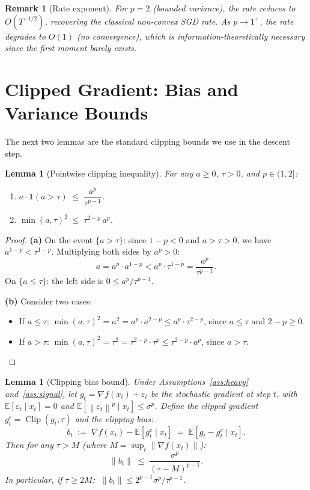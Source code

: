 \documentclass[11pt]{article}
\newtheorem{lemma}[theorem]{Lemma}
\newtheorem{remark}[theorem]{Remark}
\theoremstyle{definition}
\newcommand{\E}{\mathbb{E}}
\newcommand{\norm}[1]{\left\| #1 \right\|}
\newcommand{\clip}{\operatorname{Clip}}
\begin{document}
\begin{remark}[Rate exponent]
For $p = 2$ (bounded variance), the rate reduces to $O(T^{-1/2})$, recovering
the classical non-convex SGD rate. As $p \to 1^+$, the rate degrades to $O(1)$
(no convergence), which is information-theoretically necessary since the first
moment barely exists.
\end{remark}


\section{Clipped Gradient: Bias and Variance Bounds}
\label{sec:clipping}

The next two lemmas are the standard clipping bounds we use in the descent step.

\begin{lemma}[Pointwise clipping inequality]\label{lem:pointwise}
For any $a \geq 0$, $\tau > 0$, and $p \in (1, 2]$:
\begin{enumerate}[label=(\alph*)]
  \item $a \cdot \mathbf{1}(a > \tau) \;\leq\; \dfrac{a^p}{\tau^{p-1}}$.
  \item $\min(a, \tau)^2 \;\leq\; \tau^{2-p}\, a^p$.
\end{enumerate}
\end{lemma}

\begin{proof}
\textbf{(a)} On the event $\{a > \tau\}$: since $1 - p < 0$ and $a > \tau > 0$,
we have $a^{1-p} < \tau^{1-p}$. Multiplying both sides by $a^p > 0$:
\[
  a = a^p \cdot a^{1-p} < a^p \cdot \tau^{1-p} = \frac{a^p}{\tau^{p-1}}.
\]
On $\{a \leq \tau\}$: the left side is $0 \leq a^p/\tau^{p-1}$.

\textbf{(b)} Consider two cases:
\begin{itemize}
  \item If $a \leq \tau$: $\min(a,\tau)^2 = a^2 = a^p \cdot a^{2-p}
    \leq a^p \cdot \tau^{2-p}$, since $a \leq \tau$ and $2 - p \geq 0$.
  \item If $a > \tau$: $\min(a,\tau)^2 = \tau^2 = \tau^{2-p} \cdot \tau^p
    \leq \tau^{2-p} \cdot a^p$, since $a > \tau$.
    \qedhere
\end{itemize}
\end{proof}

\begin{lemma}[Clipping bias bound]\label{lem:bias}
Under Assumptions~\ref{ass:heavy} and~\ref{ass:signal}, let
$g_t = \nabla f(x_t) + \varepsilon_t$ be the stochastic gradient at step $t$,
with $\E[\varepsilon_t \mid x_t] = 0$ and $\E[\norm{\varepsilon_t}^p \mid x_t] \leq \sigma^p$.
Define the clipped gradient $g_t^c = \clip(g_t, \tau)$ and the clipping bias:
\[
  b_t \;:=\; \nabla f(x_t) - \E[g_t^c \mid x_t]
  \;=\; \E\!\left[g_t - g_t^c \mid x_t\right].
\]
Then for any $\tau > M$ (where $M = \sup_t \norm{\nabla f(x_t)}$):
\[
  \norm{b_t} \;\leq\; \frac{\sigma^p}{(\tau - M)^{p-1}}.
\]
In particular, if $\tau \geq 2M$:
$\;\norm{b_t} \leq 2^{p-1}\sigma^p / \tau^{p-1}$.
\end{lemma}
\end{document}

